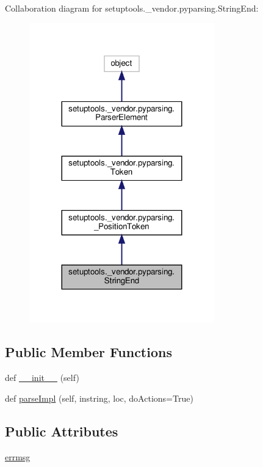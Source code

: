 Collaboration diagram for setuptools.\+\_\+vendor.\+pyparsing.\+String\+End\+:
\nopagebreak
\begin{figure}[H]
\begin{center}
\leavevmode
\includegraphics[width=227pt]{classsetuptools_1_1__vendor_1_1pyparsing_1_1StringEnd__coll__graph}
\end{center}
\end{figure}
\subsection*{Public Member Functions}
\begin{DoxyCompactItemize}
\item 
def \hyperlink{classsetuptools_1_1__vendor_1_1pyparsing_1_1StringEnd_a0243eeb507fc6a50a63906376563b032}{\+\_\+\+\_\+init\+\_\+\+\_\+} (self)
\item 
def \hyperlink{classsetuptools_1_1__vendor_1_1pyparsing_1_1StringEnd_a346b807e2ffda561b16c29f9618a96ca}{parse\+Impl} (self, instring, loc, do\+Actions=True)
\end{DoxyCompactItemize}
\subsection*{Public Attributes}
\begin{DoxyCompactItemize}
\item 
\hyperlink{classsetuptools_1_1__vendor_1_1pyparsing_1_1StringEnd_a8f2f9feb85aeecaecb6f4a5470637b3f}{errmsg}
\end{DoxyCompactItemize}
